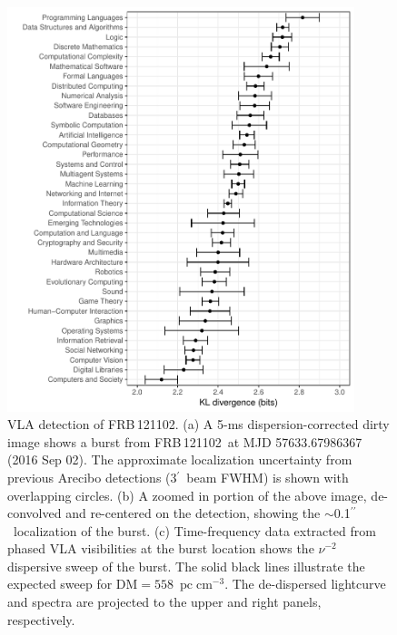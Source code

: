 \documentclass{nature_frb}
\newcommand{\frb}{FRB\,121102}
\newcommand{\dmu}{\ensuremath{\mathrm{pc\; cm^{-3}}}}
\newcommand{\arcsec}{\ensuremath{^{\prime\prime}}}
\newcommand{\arcmin}{\ensuremath{^{\prime}}}
\begin{document}
\begin{figure}
\begin{center}
\includegraphics[width=0.9\textwidth]{Fig1.pdf}
\end{center}
\caption{VLA detection of \frb. (a) A 5-ms dispersion-corrected dirty image shows a burst from \frb\ at MJD 57633.67986367 (2016 Sep 02). The approximate localization uncertainty from previous Arecibo detections\cite{ssh+16a} (3\arcmin\ beam FWHM) is shown with overlapping circles. (b) A zoomed in portion of the above image, de-convolved and re-centered on the detection, showing the $\sim$0.1\arcsec\ localization of the burst. (c) Time-frequency data extracted from phased VLA visibilities at the burst location shows the $\nu^{-2}$ dispersive sweep of the burst.
The solid black lines illustrate the expected sweep for DM$=558$~\dmu. The de-dispersed lightcurve and spectra are projected to the upper and right panels, respectively.}
\vspace{-15cm}
\label{fig:detection}
\end{figure}

\clearpage
\end{document}
